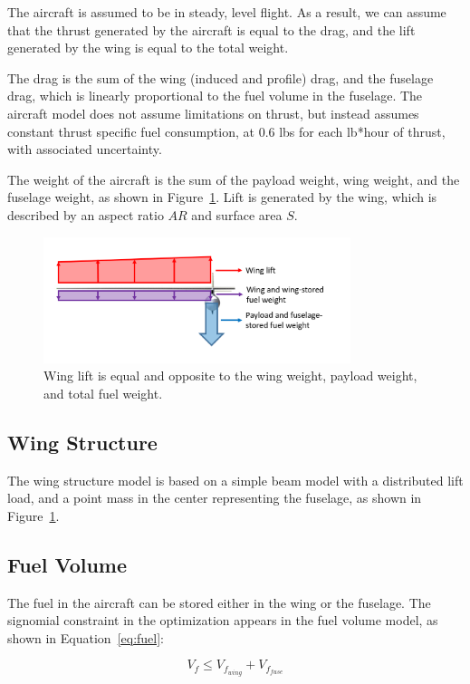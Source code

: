 \documentclass{article}
\begin{document}
The aircraft is assumed to be in steady, level flight. As a result, we can assume that the thrust generated by the aircraft is equal to the drag, and the lift generated by the wing is equal to the total weight.

The drag is the sum of the wing (induced and profile) drag, and the fuselage drag, which is linearly proportional to the fuel volume in the fuselage. The aircraft model does not assume limitations on thrust, but instead assumes constant thrust specific fuel consumption, at 0.6 lbs for each lb*hour of thrust, with associated uncertainty. 

The weight of the aircraft is the sum of the payload weight, wing weight, and the fuselage weight, as shown in Figure~\ref{fig:liftweight}. Lift is generated by the wing, which is described by an aspect ratio $AR$ and surface area $S$. 

\begin{figure}
\centering
\caption{\label{fig:liftweight} Wing lift is equal and opposite to the wing weight, payload weight, and total fuel weight.}
\includegraphics[width=0.8\textwidth]{liftweight.PNG}
\end{figure}

\subsection{Wing Structure}
The wing structure model is based on a simple beam model with a distributed lift load, and a point mass in the center representing the fuselage, as shown in Figure~\ref{fig:liftweight}.

\subsection{Fuel Volume}
The fuel in the aircraft can be stored either in the wing or the fuselage. The signomial constraint in the optimization appears in the fuel volume model, as shown in Equation~\ref{eq:fuel}:

\begin{equation}
\label{eq:fuel}
V_f \leq V_{f_{wing}} + V_{f_{fuse}} 
\end{equation}
\end{document}
